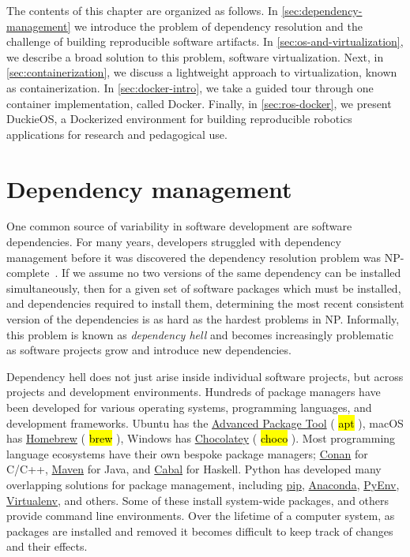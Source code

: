 \documentclass[12pt,initial,twoside,maitrise]{dms}
\newcommand{\inline}[1]{%
    \begingroup%
    \sethlcolor{slightgray}%
    \hl{\ttfamily\small #1}%
    \endgroup
}
\numberwithin{equation}{section}
\numberwithin{table}{chapter}
\numberwithin{figure}{chapter}
\begin{document}
The contents of this chapter are organized as follows. In \autoref{sec:dependency-management} we introduce the problem of dependency resolution and the challenge of building reproducible software artifacts. In \autoref{sec:os-and-virtualization}, we describe a broad solution to this problem, software virtualization. Next, in \autoref{sec:containerization}, we discuss a lightweight approach to virtualization, known as containerization. In \autoref{sec:docker-intro}, we take a guided tour through one container implementation, called Docker. Finally, in \autoref{sec:ros-docker}, we present DuckieOS, a Dockerized environment for building reproducible robotics applications for research and pedagogical use.

\section{Dependency management}\label{sec:dependency-management}

One common source of variability in software development are software dependencies. For many years, developers struggled with dependency management before it was discovered the dependency resolution problem was NP-complete~\citep{abate2012dependency}. If we assume no two versions of the same dependency can be installed simultaneously, then for a given set of software packages which must be installed, and dependencies required to install them, determining the most recent consistent version of the dependencies is as hard as the hardest problems in NP. Informally, this problem is known as \textit{dependency hell} and becomes increasingly problematic as software projects grow and introduce new dependencies.

Dependency hell does not just arise inside individual software projects, but across projects and development environments. Hundreds of package managers have been developed for various operating systems, programming languages, and development frameworks. Ubuntu has the \href{https://help.ubuntu.com/lts/serverguide/apt.html}{Advanced Package Tool} (\inline{apt}), macOS has \href{https://brew.sh/}{Homebrew} (\inline{brew}), Windows has \href{https://chocolatey.org/}{Chocolatey} (\inline{choco}). Most programming language ecosystems have their own bespoke package managers; \href{https://conan.io/}{Conan} for C/C++, \href{https://maven.apache.org}{Maven} for Java, and \href{https://www.haskell.org/cabal/}{Cabal} for Haskell. Python has developed many overlapping solutions for package management, including \href{https://pypi.org/project/pip/}{pip}, \href{https://www.anaconda.com/}{Anaconda}, \href{https://github.com/pyenv/pyenv}{PyEnv}, \href{https://virtualenv.pypa.io/}{Virtualenv}, and others. Some of these install system-wide packages, and others provide command line environments. Over the lifetime of a computer system, as packages are installed and removed it becomes difficult to keep track of changes and their effects.
\end{document}
